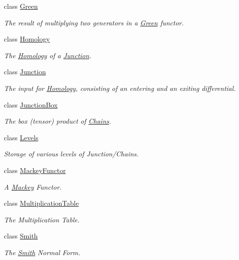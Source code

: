 \begin{DoxyCompactItemize}
class \hyperlink{classMackey_1_1Green}{Green}
\begin{DoxyCompactList}\small\item\em The result of multiplying two generators in a \hyperlink{classMackey_1_1Green}{Green} functor. \end{DoxyCompactList}\item 
class \hyperlink{classMackey_1_1Homology}{Homology}
\begin{DoxyCompactList}\small\item\em The \hyperlink{classMackey_1_1Homology}{Homology} of a \hyperlink{classMackey_1_1Junction}{Junction}. \end{DoxyCompactList}\item 
class \hyperlink{classMackey_1_1Junction}{Junction}
\begin{DoxyCompactList}\small\item\em The input for \hyperlink{classMackey_1_1Homology}{Homology}, consisting of an entering and an exiting differential. \end{DoxyCompactList}\item 
class \hyperlink{classMackey_1_1JunctionBox}{Junction\+Box}
\begin{DoxyCompactList}\small\item\em The box (tensor) product of \hyperlink{classMackey_1_1Chains}{Chains}. \end{DoxyCompactList}\item 
class \hyperlink{classMackey_1_1Levels}{Levels}
\begin{DoxyCompactList}\small\item\em Storage of various levels of Junction/\+Chains. \end{DoxyCompactList}\item 
class \hyperlink{classMackey_1_1MackeyFunctor}{Mackey\+Functor}
\begin{DoxyCompactList}\small\item\em A \hyperlink{namespaceMackey}{Mackey} Functor. \end{DoxyCompactList}\item 
class \hyperlink{classMackey_1_1MultiplicationTable}{Multiplication\+Table}
\begin{DoxyCompactList}\small\item\em The Multiplication Table. \end{DoxyCompactList}\item 
class \hyperlink{classMackey_1_1Smith}{Smith}
\begin{DoxyCompactList}\small\item\em The \hyperlink{classMackey_1_1Smith}{Smith} Normal Form. \end{DoxyCompactList}\item 

\end{DoxyCompactItemize}
